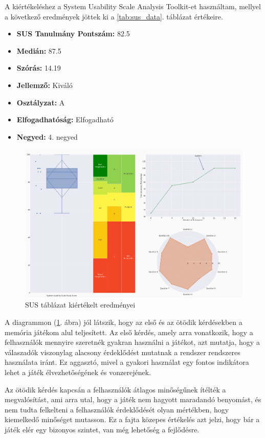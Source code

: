 A kiértékeléshez a System Usability Scale Analysis Toolkit-et \cite{SUSAnaly62:online} használtam, mellyel a következő eredmények jöttek ki a \ref{tab:sus_data}. táblázat értékeire. 

\begin{itemize}
    \item \textbf{SUS Tanulmány Pontszám:} 82.5
    \item \textbf{Medián:} 87.5
    \item \textbf{Szórás:} 14.19
    \item \textbf{Jellemző:} Kiváló
    \item \textbf{Osztályzat:} A
    \item \textbf{Elfogadhatóság:} Elfogadható
    \item \textbf{Negyed:} 4. negyed
\end{itemize}

\begin{figure}[h]
    \center
    \includegraphics[width=\textwidth]{img/single_study_plot.png}
    \caption{SUS táblázat kiértékelt eredményei}
    \label{diag:sus_result}
\end{figure}

A diagrammon (\ref{diag:sus_result}. ábra) jól látszik, hogy az első és az ötödik kérdésekben a memória játékom alul teljesített. Az első kérdés, amely arra vonatkozik, hogy a felhasználók mennyire szeretnék gyakran használni a játékot, azt mutatja, hogy a válaszadók viszonylag alacsony érdeklődést mutatnak a rendszer rendszeres használata iránt.
 Ez aggasztó, mivel a gyakori használat egy fontos indikátora lehet a játék élvezhetőségének és vonzerejének.

Az ötödik kérdés kapcsán a felhasználók átlagos minőségűnek ítélték a megvalósítást, ami arra utal, hogy a játék nem hagyott maradandó benyomást, és nem tudta felkelteni a felhasználók érdeklődését olyan mértékben, hogy kiemelkedő minőséget mutasson.
 Ez a fajta közepes értékelés azt jelzi, hogy bár a játék elér egy bizonyos szintet, van még lehetőség a fejlődésre.

